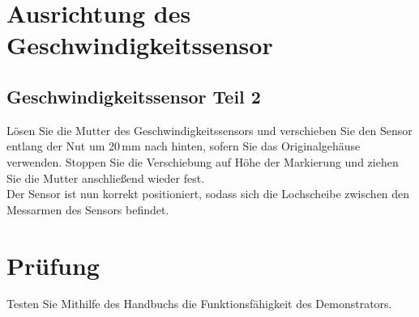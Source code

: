 \chapter {Ausrichtung des Geschwindigkeitssensor}



\section{Geschwindigkeitssensor Teil 2}
Lösen Sie die Mutter des Geschwindigkeitssensors und verschieben Sie den Sensor entlang der Nut um 20 mm nach hinten, sofern Sie das Originalgehäuse verwenden. Stoppen Sie die Verschiebung auf Höhe der Markierung und ziehen Sie die Mutter anschließend wieder fest.\\

Der Sensor ist nun korrekt positioniert, sodass sich die Lochscheibe zwischen den Messarmen des Sensors befindet.




\chapter{Prüfung}

	\item Testen Sie Mithilfe des Handbuchs die Funktionsfähigkeit des Demonstrators. 

